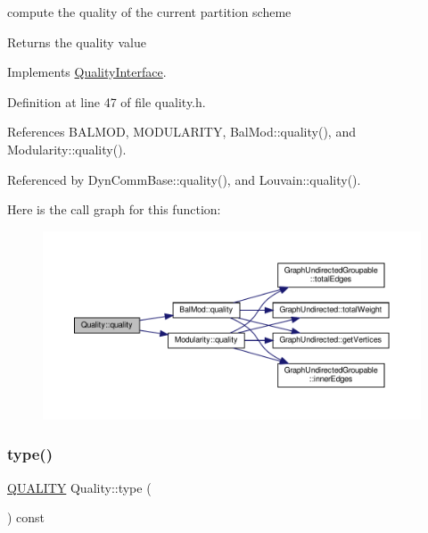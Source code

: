 compute the quality of the current partition scheme \begin{DoxyReturn}{Returns}
the quality value 
\end{DoxyReturn}


Implements \hyperlink{classQualityInterface_a1c40b3e5e51d8ed2a4390b3cb0164f0a}{Quality\+Interface}.



Definition at line 47 of file quality.\+h.



References B\+A\+L\+M\+OD, M\+O\+D\+U\+L\+A\+R\+I\+TY, Bal\+Mod\+::quality(), and Modularity\+::quality().



Referenced by Dyn\+Comm\+Base\+::quality(), and Louvain\+::quality().

Here is the call graph for this function\+:
\nopagebreak
\begin{figure}[H]
\begin{center}
\leavevmode
\includegraphics[width=350pt]{classQuality_a9a6141e9247bc85177f9fe662ec4d14a_cgraph}
\end{center}
\end{figure}
\mbox{\label{classQuality_a08b9760ee655eff3a38bec27420c2955}} 
\subsubsection{\texorpdfstring{type()}{type()}}
{\footnotesize\ttfamily \hyperlink{classQuality_ada8fae04627fbcaa8d41a1d42ae124df}{Q\+U\+A\+L\+I\+TY} Quality\+::type (\begin{DoxyParamCaption}{ }\end{DoxyParamCaption}) const\hspace{0.3cm}{\ttfamily [inline]}}

